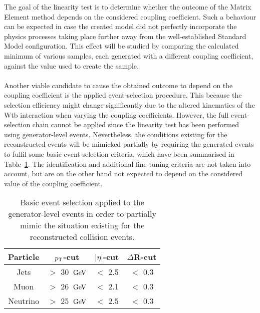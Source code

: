 The goal of the linearity test is to determine whether the outcome of the Matrix Element method depends on the considered coupling coefficient.
Such a behaviour can be expected in case the created model did not perfectly incorporate the physics processes taking place further away from the well-established Standard Model configuration.
This effect will be studied by comparing the calculated minimum of various samples, each generated with a different coupling coefficient, against the value used to create the sample.
\\
\\
Another viable candidate to cause the obtained outcome to depend on the coupling coefficient is the applied event-selection procedure.
This because the selection efficiency might change significantly due to the altered kinematics of the Wtb interaction when varying the coupling coefficients.
However, the full event-selection chain cannot be applied since the linearity test has been performed using generator-level events.
Nevertheless, the conditions existing for the reconstructed events will be mimicked partially by requiring the generated events to fulfil some basic event-selection criteria, which have been summarised in Table~\ref{table::GenCuts}.
The identification and additional fine-tuning criteria are not taken into account, but are on the other hand not expected to depend on the considered value of the coupling coefficient.
\\
\begin{table}[h!t]
 \centering
 \caption{Basic event selection applied to the generator-level events in order to partially mimic the situation existing for the reconstructed collision events.} \label{table::GenCuts}
 \renewcommand{\arraystretch}{1.2}
 \begin{tabular}{c|c|c|c}
  Particle 	& $p_{\rm T}$-cut 		& $\vert \eta \vert$-cut 	& $\Delta$R-cut 	\\
  \hline
  Jets 		& $>$ 30 $\, \mathrm{GeV}$ 	& $<$ 2.5			& $<$ 0.3		\\
  Muon		& $>$ 26 $\, \mathrm{GeV}$		& $<$ 2.1			& $<$ 0.3		\\
  Neutrino 	& $>$ 25 $\, \mathrm{GeV}$		& $<$ 2.5			& $<$ 0.3		
 \end{tabular}
\end{table}


